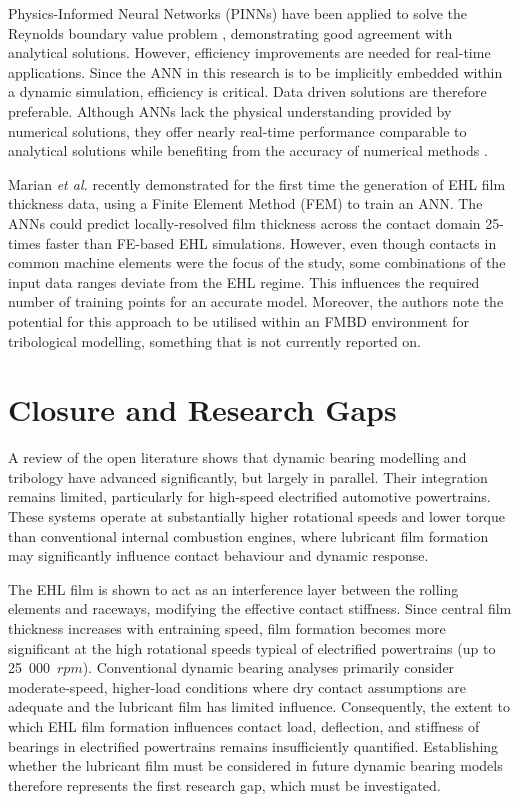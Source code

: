 Physics-Informed Neural Networks (PINNs) have been applied to solve the Reynolds boundary value problem \cite{Almqvist2021}, demonstrating good agreement with analytical solutions. However, efficiency improvements are needed for real-time applications. Since the ANN in this research is to be implicitly embedded within a dynamic simulation, efficiency is critical. Data driven solutions are therefore preferable. Although ANNs lack the physical understanding provided by numerical solutions, they offer nearly real-time performance comparable to analytical solutions while benefiting from the accuracy of numerical methods \cite{EchavarriOtero2014}. 

Marian \textit{et al.} \cite{Marian2022} recently demonstrated for the first time the generation of EHL film thickness data, using a Finite Element Method (FEM) to train an ANN. The ANNs could predict locally-resolved film thickness across the contact domain 25-times faster than FE-based EHL simulations. However, even though contacts in common machine elements were the focus of the study, some combinations of the input data ranges deviate from the EHL regime. This influences the required number of training points for an accurate model. Moreover, the authors note the potential for this approach to be utilised within an FMBD environment for tribological modelling, something that is not currently reported on.

\section{Closure and Research Gaps}

A review of the open literature shows that dynamic bearing modelling and tribology have advanced significantly, but largely in parallel. Their integration remains limited, particularly for high-speed electrified automotive powertrains. These systems operate at substantially higher rotational speeds and lower torque than conventional internal combustion engines, where lubricant film formation may significantly influence contact behaviour and dynamic response.

The EHL film is shown to act as an interference layer between the rolling elements and raceways, modifying the effective contact stiffness. Since central film thickness increases with entraining speed, film formation becomes more significant at the high rotational speeds typical of electrified powertrains (up to 25~000~$rpm$). Conventional dynamic bearing analyses primarily consider moderate-speed, higher-load conditions where dry contact assumptions are adequate and the lubricant film has limited influence. Consequently, the extent to which EHL film formation influences contact load, deflection, and stiffness of bearings in electrified powertrains remains insufficiently quantified. Establishing whether the lubricant film must be considered in future dynamic bearing models therefore represents the first research gap, which must be investigated.

